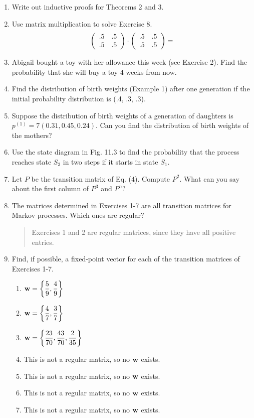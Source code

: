 \documentclass{hw}
\begin{document}
\begin{enumerate}
\item Write out inductive proofs for Theorems 2 and 3.

\item Use matrix multiplication to solve Exercise 8.
\[
\left(
\begin{array}{c c}
.5 & .5\\
.5 & .5
\end{array}
\right)
\cdot
\left(
\begin{array}{c c}
.5 & .5\\
.5 & .5
\end{array}
\right)
=
\]

\item Abigail bought a toy with her allowance this week (see Exercise 2). Find the probability that
she will buy a toy 4 weeks from now.

\item Find the distribution of birth weights (Example 1) after one generation if the initial
probability distribution is (.4, .3, .3).

\item Suppose the distribution of birth weights of a generation of daughters is
$p^{(1)}=7(0.31,0.45,0.24)$. Can you find the distribution of birth weights of the mothers?

\item Use the state diagram in Fig. 11.3 to find the probability that the process reaches state
$S_{3}$ in two steps if it starts in state $S_{1}$.

\item Let $P$ be the transition matrix of Eq. (4). Compute $P^{2}$. What can you say about the
first column of $P^{3}$ and $P^{n}$?

\setcounter{enumi}{20}
\item The matrices determined in Exercises 1-7 are all transition matrices for Markov processes.
Which ones are regular?
\begin{quote}
Exercises 1 and 2 are regular matrices, since they have all positive entries.
\end{quote}

\item Find, if possible, a fixed-point vector for each of the transition matrices of Exercises 1-7.
\begin{multicols}{2}
\begin{enumerate}
\item $\displaystyle \mathbf{w}=\left\{{5\over9}, {4\over9}\right\}$
\item $\displaystyle \mathbf{w}=\left\{{4\over7}, {3\over7}\right\}$
\item $\displaystyle \mathbf{w}=\left\{{23\over70}, {43\over70}, {2\over35}\right\}$
\item This is not a regular matrix, so no $\bf{w}$ exists.
\item This is not a regular matrix, so no $\bf{w}$ exists.
\item This is not a regular matrix, so no $\bf{w}$ exists.
\item This is not a regular matrix, so no $\bf{w}$ exists.
\end{enumerate}
\end{multicols}


\end{enumerate}
\end{document}
